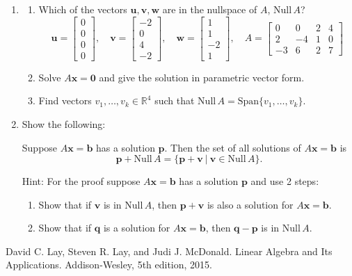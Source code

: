 \documentclass[12pt,a4paper]{amsart}
\newcommand{\bb}{\mathbf{b}}
\newcommand{\bo}{\mathbf{0}}
\newcommand{\bp}{\mathbf{p}}
\newcommand{\bq}{\mathbf{q}}
\newcommand{\bu}{\mathbf{u}}
\newcommand{\bv}{\mathbf{v}}
\newcommand{\bw}{\mathbf{w}}
\newcommand{\bx}{\mathbf{x}}
\newcommand{\R}{\mathbb{R}}
\newcommand{\Nul}{\mathrm{Null\,}}
\newcommand{\Span}{\mathrm{Span}}
\begin{document}
\begin{enumerate}
\item\label{mat12}
\begin{enumerate}
\item Which of the vectors $\bu,\bv,\bw$ are in the nullspace of $A$, $\Nul A$?
\[ 
\bu = \left[\begin{matrix} 0 \\ 0 \\ 0 \\ 0 \end{matrix}\right], \quad
\bv = \left[\begin{matrix} -2 \\ 0 \\ 4 \\ -2 \end{matrix}\right], \quad
\bw = \left[\begin{matrix} 1 \\ 1 \\ -2 \\ 1 \end{matrix}\right], \quad
A = \left[ \begin{matrix}
 0 & 0 & 2 & 4 \\
 2 & -4 & 1 & 0 \\
 -3 & 6 & 2 & 7
 \end{matrix} \right] \]

\item  Solve $A\bx=\bo$ and give the solution in parametric vector form.

\item  Find vectors $v_1,\dots,v_k \in \R^4$ such that $\Nul A = \Span\{ v_1,\dots,v_k \}$.
\end{enumerate}




\item
Show the following:

\bigskip

 Suppose $A\bx=\bb$ has a solution $\mathbf{p}$. Then the set of all solutions of $A\bx=\bb$ is
\[ \mathbf{p}+\Nul A = \{\mathbf{p}+\mathbf{v}\ |\ \mathbf{v} \in \Nul A\}. \]

\bigskip

\noindent Hint: For the proof suppose $A\bx=\bb$ has a solution $\bp$ and use 2 steps:
\begin{enumerate}
\item Show that if $\bv$ is in $\Nul A$, then $\bp+\bv$ is also a solution for $A\bx=\bb$.
\item Show that if $\bq$ is a solution for $A\bx=\bb$, then $\mathbf{q}-\bp$ is in $\Nul A$.
\end{enumerate}
 
\end{enumerate}




\begin{thebibliography}{1}
 David C. Lay, Steven R. Lay, and Judi J. McDonald.
\newblock Linear Algebra and Its Applications.
\newblock Addison-Wesley, 5th edition, 2015.
\end{thebibliography}
\end{document}
